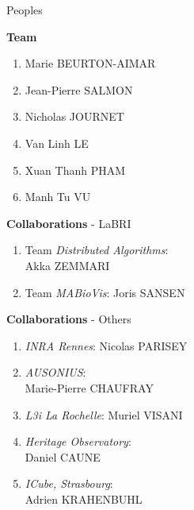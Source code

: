 \documentclass{beamer}
\begin{document}
\begin{frame}[t]{Peoples}	
	\begin{minipage}[t]{\textwidth}
		\begin{minipage}[t]{0.45\textwidth}
		\textbf{Team}
		\begin{enumerate}
			\item Marie BEURTON-AIMAR
			\item Jean-Pierre SALMON
			\item Nicholas JOURNET
			\item Van Linh LE
			\item Xuan Thanh PHAM
			\item Manh Tu VU
		\end{enumerate}
		\end{minipage}%
		\hspace{0.05\textwidth}
		\begin{minipage}[t]{0.5\textwidth}
		\textbf{Collaborations} - LaBRI		
		\small{
		\begin{enumerate}
			\item Team \textit{Distributed Algorithms}:\\ Akka ZEMMARI
			\item Team \textit{MABioVis}: Joris SANSEN
		\end{enumerate}}
		\textbf{Collaborations} - Others
		\small{
		\begin{enumerate}
			\item \textit{INRA Rennes}: Nicolas PARISEY
			\item \textit{AUSONIUS}:\\Marie-Pierre CHAUFRAY
			\item \textit{L3i La Rochelle}: Muriel VISANI
			\item \textit{Heritage Observatory}:\\Daniel CAUNE
			\item \textit{ICube, Strasbourg}:\\Adrien KRAHENBUHL
		\end{enumerate}
		}
		\end{minipage}
	\end{minipage}
	
	
\end{frame}
\end{document}
